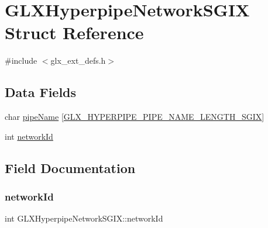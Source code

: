 \hypertarget{struct_g_l_x_hyperpipe_network_s_g_i_x}{}\section{G\+L\+X\+Hyperpipe\+Network\+S\+G\+IX Struct Reference}
\label{struct_g_l_x_hyperpipe_network_s_g_i_x}


{\ttfamily \#include $<$glx\+\_\+ext\+\_\+defs.\+h$>$}

\subsection*{Data Fields}
\begin{DoxyCompactItemize}
\item 
char \hyperlink{struct_g_l_x_hyperpipe_network_s_g_i_x_a6338b9717fa895aec16b932f2ef693ed}{pipe\+Name} \mbox{[}\hyperlink{glx__ext__defs_8h_ae1c8261c0861010d8003a31d07e26005}{G\+L\+X\+\_\+\+H\+Y\+P\+E\+R\+P\+I\+P\+E\+\_\+\+P\+I\+P\+E\+\_\+\+N\+A\+M\+E\+\_\+\+L\+E\+N\+G\+T\+H\+\_\+\+S\+G\+IX}\mbox{]}
\item 
int \hyperlink{struct_g_l_x_hyperpipe_network_s_g_i_x_a81393053988b32fadb0b21615024add1}{network\+Id}
\end{DoxyCompactItemize}


\subsection{Field Documentation}
\mbox{\label{struct_g_l_x_hyperpipe_network_s_g_i_x_a81393053988b32fadb0b21615024add1}} 
\subsubsection{\texorpdfstring{network\+Id}{networkId}}
{\footnotesize\ttfamily int G\+L\+X\+Hyperpipe\+Network\+S\+G\+I\+X\+::network\+Id}

\mbox{\label{struct_g_l_x_hyperpipe_network_s_g_i_x_a6338b9717fa895aec16b932f2ef693ed}} 
